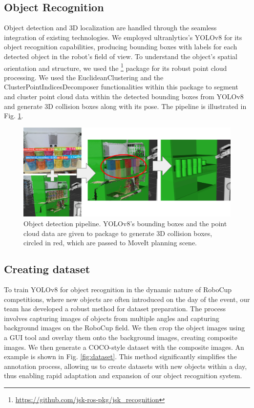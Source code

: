 \documentclass[runningheads,a4paper]{llncs}
\begin{document}
\subsection{Object Recognition}
Object detection and 3D localization are handled through the seamless integration of existing technologies.
We employed ultranlytics’s YOLOv8\cite{yolov8_ultralytics} for its object recognition capabilities, producing bounding boxes with labels for each detected object in the robot’s field of view.
To understand the object’s spatial orientation and structure, we used the \footnote{\url{https://github.com/jsk-ros-pkg/jsk\_recognition}} package for its robust point cloud processing.
We used the EuclideanClustering and the ClusterPointIndicesDecomposer functionalities within this package to segment and cluster point cloud data within the detected bounding boxes from YOLOv8 and generate 3D collision boxes along with its pose.
The pipeline is illustrated in Fig. \ref{fig:object_detection_pipeline}.
\begin{figure}[tbp]
	\centering
	\includegraphics[width=1.0\linewidth]{images/object_detection_pipeline.png}
	\caption{Object detection pipeline.
		YOLOv8's bounding boxes and the point cloud data are given to  package to generate 3D collision boxes, circled in red, which are passed to MoveIt planning scene.}
	\label{fig:object_detection_pipeline}
\end{figure}

\subsection{Creating dataset}
To train YOLOv8 for object recognition in the dynamic nature of RoboCup competitions, where new objects are often introduced on the day of the event, our team has developed a robust method for dataset preparation.
The process involves capturing images of objects from multiple angles and capturing background images on the RoboCup field.
We then crop the object images using a GUI tool and overlay them onto the background images, creating composite images.
We then generate a COCO-style dataset with the composite images.
An example is shown in Fig. \ref{fig:dataset}.
This method significantly simplifies the annotation process, allowing us to create datasets with new objects within a day, thus enabling rapid adaptation and expansion of our object recognition system.
\end{document}
